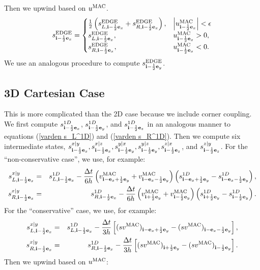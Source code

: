 Then we upwind based on $u^{\rm MAC}$.
\begin{equation}
s_{{\bf i}-\frac{1}{2}{\bf e}_x}^{\rm EDGE} =
\begin{cases}
\frac{1}{2}\left(s_{L,{\bf i}-\frac{1}{2}{\bf e}_x}^{\rm EDGE} + s_{R,{\bf i}-\frac{1}{2}{\bf e}_x}^{\rm EDGE}\right), & \left|u^{\rm MAC}_{{\bf i}-\frac{1}{2}{\bf e}_x}\right| < \epsilon \\
s_{L,{\bf i}-\frac{1}{2}{\bf e}_x}^{\rm EDGE}, & u^{\rm MAC}_{{\bf i}-\frac{1}{2}{\bf e}_x} > 0, \\
s_{R,{\bf i}-\frac{1}{2}{\bf e}_x}^{\rm EDGE}, & u^{\rm MAC}_{{\bf i}-\frac{1}{2}{\bf e}_x} < 0.
\end{cases}\label{varden s^edge upwind}
\end{equation}
We use an analogous procedure to compute $s_{{\bf i}-\frac{1}{2}{\bf e}_y}^{\rm EDGE}$.

\subsection{3D Cartesian Case}
This is more complicated than the 2D case because we include corner
coupling.  We first compute $s_{{\bf i}-\frac{1}{2}{\bf e}_x}^{1D}$,
$s_{{\bf i}-\frac{1}{2}{\bf e}_y}^{1D}$, and $s_{{\bf i}-\frac{1}{2}{\bf e}_z}^{1D}$ in an
analogous manner to equations (\ref{varden s_L^1D}) and 
(\ref{varden s_R^1D}).  Then we compute six intermediate states,
$s_{{\bf i}-\frac{1}{2}{\bf e}_x}^{x|y}, s_{{\bf i}-\frac{1}{2}{\bf e}_x}^{x|z},
s_{{\bf i}-\frac{1}{2}{\bf e}_y}^{y|x}, s_{{\bf i}-\frac{1}{2}{\bf e}_y}^{y|z},
s_{{\bf i}-\frac{1}{2}{\bf e}_z}^{z|x}$, and $s_{{\bf i}-\frac{1}{2}{\bf e}_z}^{z|y}$.  For the
``non-conservative case'', we use, for example:
\begin{eqnarray}
s_{L,{\bf i}-\frac{1}{2}{\bf e}_x}^{x|y} &=& s_{L,{\bf i}-\frac{1}{2}{\bf e}_x}^{1D} - \frac{\Delta t}{6h}\left(v_{{\bf i}-{\bf e}_x+\frac{1}{2}{\bf e}_y}^{\rm MAC} + v_{{\bf i}-{\bf e}_x-\frac{1}{2}{\bf e}_y}^{\rm MAC}\right)\left(s_{{\bf i}-{\bf e}_x+\frac{1}{2}{\bf e}_y}^{1D} - s_{{\bf i}-{\bf e}_x-\frac{1}{2}{\bf e}_y}^{1D}\right), \\
s_{R,{\bf i}-\frac{1}{2}{\bf e}_x}^{x|y} &=& s_{R,{\bf i}-\frac{1}{2}{\bf e}_x}^{1D} - \frac{\Delta t}{6h}\left(v_{{\bf i}+\frac{1}{2}{\bf e}_y}^{\rm MAC} + v_{{\bf i}-\frac{1}{2}{\bf e}_y}^{\rm MAC}\right)\left(s_{{\bf i}+\frac{1}{2}{\bf e}_y}^{1D} - s_{{\bf i}-\frac{1}{2}{\bf e}_y}^{1D}\right).
\end{eqnarray}
For the ``conservative'' case, we use, for example:
\begin{eqnarray}
s_{L,{\bf i}-\frac{1}{2}{\bf e}_x}^{x|y} &=& s_{L,{\bf i}-\frac{1}{2}{\bf e}_x}^{1D} - \frac{\Delta t}{3h}\left[(sv^{\rm MAC})_{{\bf i}-{\bf e}_x+\frac{1}{2}{\bf e}_y}-(sv^{\rm MAC})_{{\bf i}-{\bf e}_x-\frac{1}{2}{\bf e}_y}\right], \\
s_{R,{\bf i}-\frac{1}{2}{\bf e}_x}^{x|y} &=& s_{R,{\bf i}-\frac{1}{2}{\bf e}_x}^{1D} - \frac{\Delta t}{3h}\left[(sv^{\rm MAC})_{{\bf i}+\frac{1}{2}{\bf e}_y}-(sv^{\rm MAC})_{{\bf i}-\frac{1}{2}{\bf e}_y}\right].
\end{eqnarray}
Then we upwind based on $u^{\rm MAC}$:

